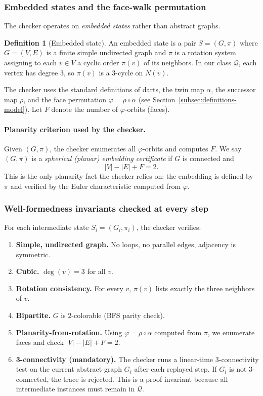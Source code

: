 \documentclass[12pt]{article}
\theoremstyle{definition}
\newtheorem{definition}[theorem]{Definition}
\begin{document}
\subsubsection{Embedded states and the face-walk permutation}
\label{subsubsec:checker-embedded-states}

The checker operates on \emph{embedded states} rather than abstract graphs.

\begin{definition}[Embedded state]
An embedded state is a pair $S=(G,\pi)$ where $G=(V,E)$ is a finite simple undirected graph
and $\pi$ is a rotation system assigning to each $v\in V$ a cyclic order $\pi(v)$ of its neighbors.
In our class $\mathcal{Q}$, each vertex has degree $3$, so $\pi(v)$ is a 3-cycle on $N(v)$.
\end{definition}

The checker uses the standard definitions of darts, the twin map $\alpha$, the successor map $\rho$, and the face permutation $\varphi = \rho \circ \alpha$ (see Section~\ref{subsec:definitions-model}). Let $F$ denote the number of $\varphi$-orbits (faces).

\paragraph{Planarity criterion used by the checker.}
Given $(G,\pi)$, the checker enumerates all $\varphi$-orbits and computes $F$.
We say $(G,\pi)$ is a \emph{spherical (planar) embedding certificate} if $G$ is connected and
\[
|V|-|E|+F = 2.
\]
This is the only planarity fact the checker relies on: the embedding is defined by $\pi$ and verified by the
Euler characteristic computed from $\varphi$.

\subsubsection{Well-formedness invariants checked at every step}
\label{subsubsec:checker-invariants}

For each intermediate state $S_i=(G_i,\pi_i)$, the checker verifies:

\begin{enumerate}
\item \textbf{Simple, undirected graph.} No loops, no parallel edges, adjacency is symmetric.
\item \textbf{Cubic.} $\deg(v)=3$ for all $v$.
\item \textbf{Rotation consistency.} For every $v$, $\pi(v)$ lists exactly the three neighbors of $v$.
\item \textbf{Bipartite.} $G$ is 2-colorable (BFS parity check).
\item \textbf{Planarity-from-rotation.} Using $\varphi=\rho\circ\alpha$ computed from $\pi$, we enumerate faces and check
$|V|-|E|+F=2$.
\item \textbf{3-connectivity (mandatory).} The checker runs a linear-time 3-connectivity test on the current abstract graph $G_i$ after each replayed step. If $G_i$ is not 3-connected, the trace is rejected. This is a proof invariant because all intermediate instances must remain in $\mathcal{Q}$.
\end{enumerate}
\end{document}
